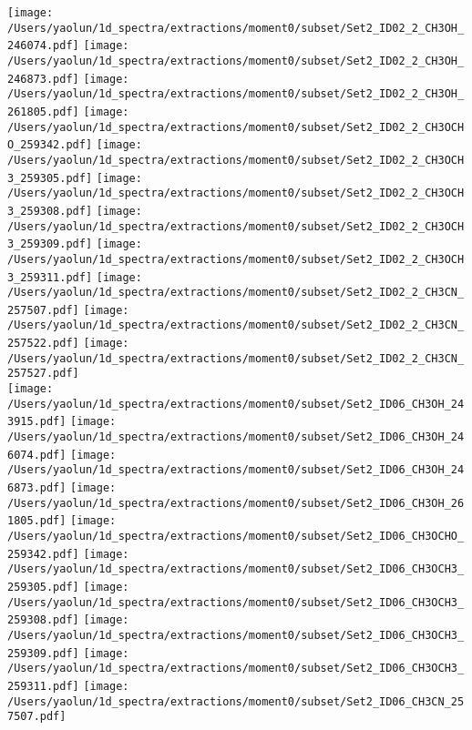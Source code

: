 \begin{figure*}[htbp!]
  \texttt{[image: /Users/yaolun/1d\_spectra/extractions/moment0/subset/Set2\_ID02\_2\_CH3OH\_246074.pdf]}
  \texttt{[image: /Users/yaolun/1d\_spectra/extractions/moment0/subset/Set2\_ID02\_2\_CH3OH\_246873.pdf]}
  \texttt{[image: /Users/yaolun/1d\_spectra/extractions/moment0/subset/Set2\_ID02\_2\_CH3OH\_261805.pdf]}
  \texttt{[image: /Users/yaolun/1d\_spectra/extractions/moment0/subset/Set2\_ID02\_2\_CH3OCHO\_259342.pdf]}
  \texttt{[image: /Users/yaolun/1d\_spectra/extractions/moment0/subset/Set2\_ID02\_2\_CH3OCH3\_259305.pdf]}
  \texttt{[image: /Users/yaolun/1d\_spectra/extractions/moment0/subset/Set2\_ID02\_2\_CH3OCH3\_259308.pdf]}
  \texttt{[image: /Users/yaolun/1d\_spectra/extractions/moment0/subset/Set2\_ID02\_2\_CH3OCH3\_259309.pdf]}
  \texttt{[image: /Users/yaolun/1d\_spectra/extractions/moment0/subset/Set2\_ID02\_2\_CH3OCH3\_259311.pdf]}
  \texttt{[image: /Users/yaolun/1d\_spectra/extractions/moment0/subset/Set2\_ID02\_2\_CH3CN\_257507.pdf]}
  \texttt{[image: /Users/yaolun/1d\_spectra/extractions/moment0/subset/Set2\_ID02\_2\_CH3CN\_257522.pdf]}
  \texttt{[image: /Users/yaolun/1d\_spectra/extractions/moment0/subset/Set2\_ID02\_2\_CH3CN\_257527.pdf]}
  \\
  \texttt{[image: /Users/yaolun/1d\_spectra/extractions/moment0/subset/Set2\_ID06\_CH3OH\_243915.pdf]}
  \texttt{[image: /Users/yaolun/1d\_spectra/extractions/moment0/subset/Set2\_ID06\_CH3OH\_246074.pdf]}
  \texttt{[image: /Users/yaolun/1d\_spectra/extractions/moment0/subset/Set2\_ID06\_CH3OH\_246873.pdf]}
  \texttt{[image: /Users/yaolun/1d\_spectra/extractions/moment0/subset/Set2\_ID06\_CH3OH\_261805.pdf]}
  \texttt{[image: /Users/yaolun/1d\_spectra/extractions/moment0/subset/Set2\_ID06\_CH3OCHO\_259342.pdf]}
  \texttt{[image: /Users/yaolun/1d\_spectra/extractions/moment0/subset/Set2\_ID06\_CH3OCH3\_259305.pdf]}
  \texttt{[image: /Users/yaolun/1d\_spectra/extractions/moment0/subset/Set2\_ID06\_CH3OCH3\_259308.pdf]}
  \texttt{[image: /Users/yaolun/1d\_spectra/extractions/moment0/subset/Set2\_ID06\_CH3OCH3\_259309.pdf]}
  \texttt{[image: /Users/yaolun/1d\_spectra/extractions/moment0/subset/Set2\_ID06\_CH3OCH3\_259311.pdf]}
  \texttt{[image: /Users/yaolun/1d\_spectra/extractions/moment0/subset/Set2\_ID06\_CH3CN\_257507.pdf]}

\end{figure*}
